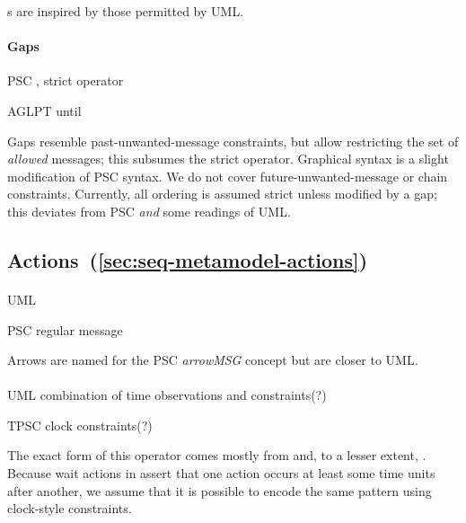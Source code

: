 \mloopbound s are inspired by those permitted by UML.

\paragraph{Gaps}
\begin{featset}
\item[PSC] , strict operator
\item[AGLPT] until
\end{featset}

Gaps resemble past-unwanted-message constraints, but
allow restricting the set of \emph{allowed} messages;
this subsumes the strict operator.  Graphical syntax is a slight
modification of PSC syntax.  We do not cover
future-unwanted-message or chain constraints.  Currently, all
ordering is assumed strict unless modified by a gap; this
deviates from PSC \emph{and} some readings of UML.
    
\subsection{Actions~(\ref{sec:seq-metamodel-actions})}

\paragraph{\marrowaction}
\begin{featset}
\item[UML] 
\item[PSC] regular message
\end{featset}

Arrows are named for the PSC \emph{arrowMSG} concept but are closer
to UML.
      
\paragraph{\mwaitaction}
\begin{featset}
\item[UML] combination of time observations and constraints(?)
\item[TPSC] clock constraints(?)
\end{featset}

The exact form of this operator comes mostly from \robochart{} and, to
a lesser extent, \tockcsp.
Because wait actions in \langname{} assert that one
action occurs at least some time units after another, we assume that it is
possible to encode the same pattern using clock-style constraints.

